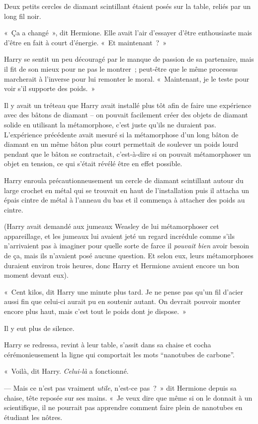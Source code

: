 Deux petits cercles de diamant scintillant étaient posés sur la table, reliés par un long fil noir.

«~Ça a changé~», dit Hermione. Elle avait l'air d'essayer d'être enthousiaste mais d'être en fait à court d'énergie. «~Et maintenant~?~»

Harry se sentit un peu découragé par le manque de passion de sa partenaire, mais il fit de son mieux pour ne pas le montrer~; peut-être que le même processus marcherait à l'inverse pour lui remonter le moral. «~Maintenant, je le teste pour voir s'il supporte des poids.~»

Il y avait un tréteau que Harry avait installé plus tôt afin de faire une expérience avec des bâtons de diamant -- on pouvait facilement créer des objets de diamant solide en utilisant la métamorphose, c'est juste qu'ils ne duraient pas. L'expérience précédente avait mesuré si la métamorphose d'un long bâton de diamant en un même bâton plus court permettait de soulever un poids lourd pendant que le bâton se contractait, c'est-à-dire si on pouvait métamorphoser un objet en tension, ce qui s'était révélé être en effet possible.

Harry enroula précautionneusement un cercle de diamant scintillant autour du large crochet en métal qui se trouvait en haut de l'installation puis il attacha un épais cintre de métal à l'anneau du bas et il commença à attacher des poids au cintre.

(Harry avait demandé aux jumeaux Weasley de lui métamorphoser cet appareillage, et les jumeaux lui avaient jeté un regard incrédule comme s'ils n'arrivaient pas à imaginer pour quelle sorte de farce il \emph{pouvait bien} avoir besoin de ça, mais ils n'avaient posé aucune question. Et selon eux, leurs métamorphoses duraient environ trois heures, donc Harry et Hermione avaient encore un bon moment devant eux).

«~Cent kilos, dit Harry une minute plus tard. Je ne pense pas qu'un fil d'acier aussi fin que celui-ci aurait pu en soutenir autant. On devrait pouvoir monter encore plus haut, mais c'est tout le poids dont je dispose.~»

Il y eut plus de silence.

Harry se redressa, revint à leur table, s'assit dans sa chaise et cocha cérémonieusement la ligne qui comportait les mots “nanotubes de carbone”.

«~Voilà, dit Harry. \emph{Celui-là} a fonctionné.

--- Mais ce n'est pas vraiment \emph{utile}, n'est-ce pas~?~» dit Hermione depuis sa chaise, tête reposée sur ses mains. «~Je veux dire que même si on le donnait à un scientifique, il ne pourrait pas apprendre comment faire plein de nanotubes en étudiant les nôtres.

